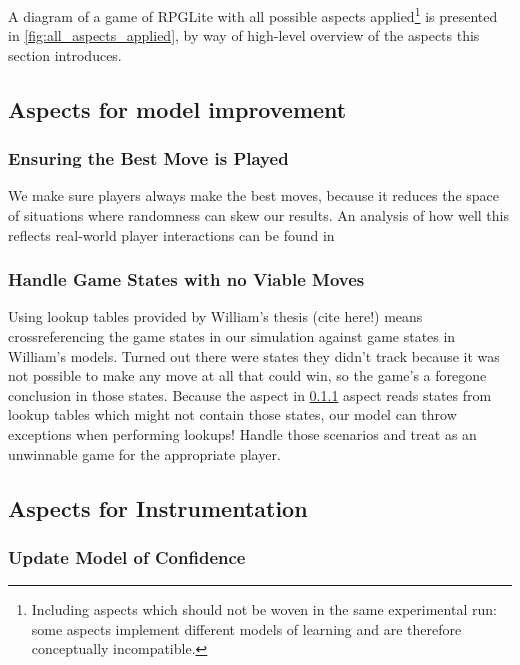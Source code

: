 A diagram of a game of RPGLite with all possible aspects
applied\footnote{Including aspects which should not be woven in the same
experimental run: some aspects implement different models of learning and are
therefore conceptually incompatible.} is
presented in \cref{fig:all_aspects_applied}, by way of high-level overview of
the aspects this section introduces.

\subsection{Aspects for model improvement}

\subsubsection{Ensuring the Best Move is Played}\label{subsubsec:ensure_best_move}

We make sure players always make the best moves, because it reduces the space of
situations where randomness can skew our results. An analysis of how well this
reflects real-world player interactions can be found in 

\subsubsection{Handle Game States with no Viable Moves}

Using lookup tables provided by William's thesis (cite here!) means
crossreferencing the game states in our simulation against game states in
William's models. Turned out there were states they didn't track because it was
not possible to make any move at all that could win, so the game's a foregone
conclusion in those states. Because the aspect in
\cref{subsubsec:ensure_best_move} aspect reads states from lookup tables which
might not contain those states, our model can throw exceptions when performing
lookups! Handle those scenarios and treat as an unwinnable game for the
appropriate player.


\subsection{Aspects for Instrumentation}

\subsubsection{Update Model of Confidence}

